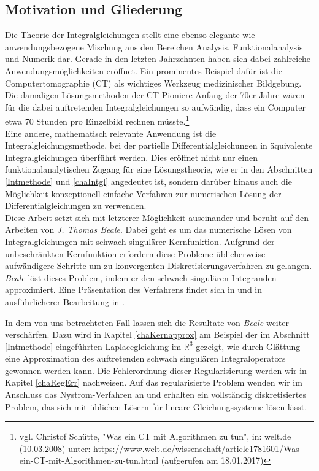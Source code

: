 \documentclass[12pt,a4paper]{scrartcl}
\numberwithin{equation}{section}
\newcommand{\R}{\mathbb{R}} %
\begin{document}
\subsection{Motivation und Gliederung}
Die Theorie der Integralgleichungen stellt eine ebenso elegante wie anwendungsbezogene Mischung aus den Bereichen Analysis, Funktionalanalysis und Numerik dar. Gerade in den letzten Jahrzehnten haben sich dabei zahlreiche Anwendungsmöglichkeiten eröffnet. Ein prominentes Beispiel dafür ist die Computertomographie (CT) als wichtiges Werkzeug medizinischer Bildgebung. Die damaligen Lösungsmethoden der CT-Pioniere Anfang der 70er Jahre wären für die dabei auftretenden Integralgleichungen so aufwändig, dass ein Computer etwa 70 Stunden pro Einzelbild rechnen müsste.\footnote{vgl. Christof Schütte, "Was ein CT mit Algorithmen zu tun", in: welt.de (10.03.2008) unter: https://www.welt.de/wissenschaft/article1781601/Was-ein-CT-mit-Algorithmen-zu-tun.html (aufgerufen am 18.01.2017) } \\
Eine andere, mathematisch relevante Anwendung ist die Integralgleichungsmethode, bei der partielle Differentialgleichungen in äquivalente Integralgleichungen überführt werden. Dies eröffnet nicht nur einen funktionalanalytischen Zugang für eine Lösungstheorie, wie er in den Abschnitten \ref{Intmethode} und \ref{chaIntgl} angedeutet ist, sondern darüber hinaus auch die Möglichkeit konzeptionell einfache Verfahren zur numerischen Lösung der Differentialgleichungen zu verwenden. \\

Diese Arbeit setzt sich mit letzterer Möglichkeit auseinander und beruht auf den Arbeiten von \emph{J. Thomas Beale}. Dabei geht es um das numerische Lösen von Integralgleichungen mit schwach singulärer Kernfunktion. Aufgrund der unbeschränkten Kernfunktion erfordern diese Probleme üblicherweise aufwändigere Schritte um zu konvergenten Diskretisierungsverfahren zu gelangen.
\emph{Beale} löst dieses Problem, indem er den schwach singulären Integranden approximiert.
Eine Präsentation des Verfahrens findet sich in \cite{beale} und in ausführlicherer Bearbeitung in \cite{Collet}. 

In dem von uns betrachteten Fall lassen sich die Resultate von \emph{Beale} weiter verschärfen. Dazu wird in Kapitel \ref{chaKernapprox} am Beispiel der im Abschnitt \ref{Intmethode} eingeführten Laplacegleichung im $\R^3$ gezeigt, wie durch Glättung eine Approximation des auftretenden schwach singulären Integraloperators gewonnen werden kann. Die Fehlerordnung dieser Regularisierung werden wir in Kapitel \ref{chaRegErr} nachweisen. Auf das regularisierte Problem wenden wir im Anschluss das Nystrom-Verfahren an und erhalten ein vollständig diskretisiertes Problem, das sich mit üblichen Lösern für lineare Gleichungssysteme lösen lässt. 
\end{document}
